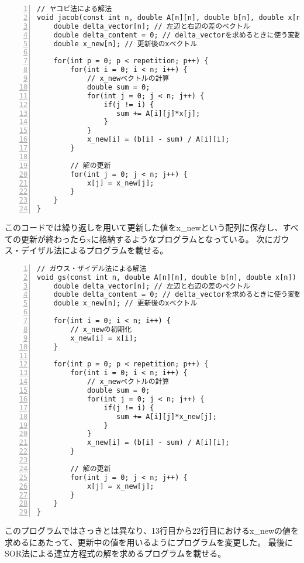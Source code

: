 \documentclass[a4paper]{jsarticle}
\begin{document}
\begin{lstlisting}[caption={ヤコビ法のプログラム}, numbers=left, label={jacob_code}]
// ヤコビ法による解法
void jacob(const int n, double A[n][n], double b[n], double x[n]) {
    double delta_vector[n]; // 左辺と右辺の差のベクトル
    double delta_content = 0; // delta_vectorを求めるときに使う変数
    double x_new[n]; // 更新後のxベクトル

    for(int p = 0; p < repetition; p++) {
        for(int i = 0; i < n; i++) {
            // x_newベクトルの計算
            double sum = 0;
            for(int j = 0; j < n; j++) {
                if(j != i) {
                   sum += A[i][j]*x[j];
                }
            }
            x_new[i] = (b[i] - sum) / A[i][i];
        }

        // 解の更新
        for(int j = 0; j < n; j++) {
            x[j] = x_new[j];
        }
    }
}
\end{lstlisting}

このコードでは繰り返しを用いて更新した値をx\_newという配列に保存し、すべての更新が終わったらxに格納するようなプログラムとなっている。
次にガウス・デイザル法によるプログラムを載せる。

\begin{lstlisting}[caption={\texttt{ガウス・デイザル法のプログラム}}, numbers=left, label={gd_solution}]
// ガウス・ザイデル法による解法
void gs(const int n, double A[n][n], double b[n], double x[n]) {
    double delta_vector[n]; // 左辺と右辺の差のベクトル
    double delta_content = 0; // delta_vectorを求めるときに使う変数
    double x_new[n]; // 更新後のxベクトル

    for(int i = 0; i < n; i++) {
        // x_newの初期化
        x_new[i] = x[i];
    }

    for(int p = 0; p < repetition; p++) {
        for(int i = 0; i < n; i++) {
            // x_newベクトルの計算
            double sum = 0;
            for(int j = 0; j < n; j++) {
                if(j != i) {
                   sum += A[i][j]*x_new[j];
                }
            }
            x_new[i] = (b[i] - sum) / A[i][i];
        }

        // 解の更新
        for(int j = 0; j < n; j++) {
            x[j] = x_new[j];
        }
    }
}
\end{lstlisting}

このプログラムではさっきとは異なり、13行目から22行目におけるx\_newの値を求めるにあたって、更新中の値を用いるようにプログラムを変更した。
最後にSOR法による連立方程式の解を求めるプログラムを載せる。
\end{document}
